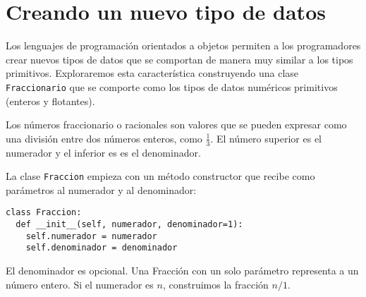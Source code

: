

%

\chapter{Creando un nuevo tipo de datos}
\label{overloading}

Los lenguajes de programación orientados a objetos permiten a los
programadores crear nuevos tipos de datos que se comportan de 
manera muy similar a los tipos primitivos. Exploraremos esta 
característica construyendo una clase \texttt{Fraccionario} que
se comporte como los tipos de datos numéricos primitivos (enteros
y flotantes).

Los números fraccionario o racionales son valores que se pueden 
expresar como una división entre dos números enteros, como  $\frac{1}{3}$.  
El número superior es el numerador y el inferior es
es el denominador.


La clase  \texttt{Fraccion} empieza con un método constructor que
recibe como parámetros al numerador y al denominador:


\begin{verbatim}
class Fraccion:
  def __init__(self, numerador, denominador=1):
    self.numerador = numerador
    self.denominador = denominador
\end{verbatim}
%
El denominador es opcional.  Una Fracción con un solo 
parámetro representa a un número entero.  Si el numerador es
$n$, construimos la fracción $n/1$.

